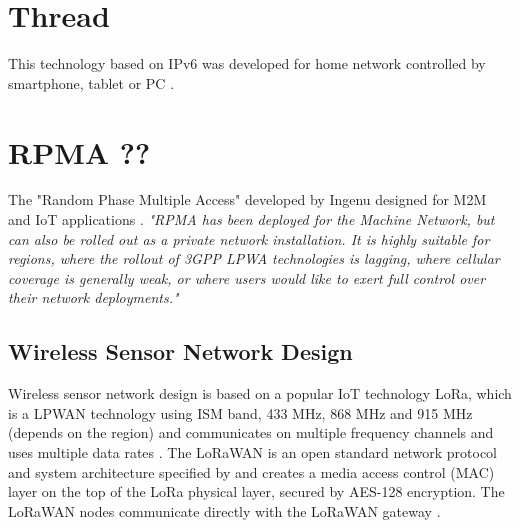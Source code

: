 \section{Thread}
This technology based on IPv6 was developed for home network controlled by smartphone, tablet or PC \cite{29} \cite{30} \cite{31}.


\section{RPMA ??}
The "Random Phase Multiple Access" developed by Ingenu designed for M2M and IoT applications \cite{32} \cite{rpma_ublox} \cite{34}. \textit{"RPMA has been deployed for the Machine Network, but can also be rolled out as a private network installation. It is highly suitable for regions, where the rollout of 3GPP LPWA technologies is lagging, where cellular coverage is generally weak, or where users would like to exert full control over their network deployments."}\cite{rpma_ublox}






\subsection{Wireless Sensor Network Design}
Wireless sensor network design is based on a popular IoT technology LoRa, which is a LPWAN technology using ISM band, 433 MHz, 868 MHz and 915 MHz (depends on the region) and communicates on multiple frequency channels and uses multiple data rates \cite{LoRaWAN Evaluation for IoT Communications}.
The LoRaWAN is an open standard network protocol and system architecture specified by \cite{LoRaWAN specification} and creates a media access control (MAC) layer on the top of the LoRa physical layer, secured by AES-128 encryption.
The LoRaWAN nodes communicate directly with the LoRaWAN gateway \cite{Internet of Things (IoT) using LoRa technology}.


